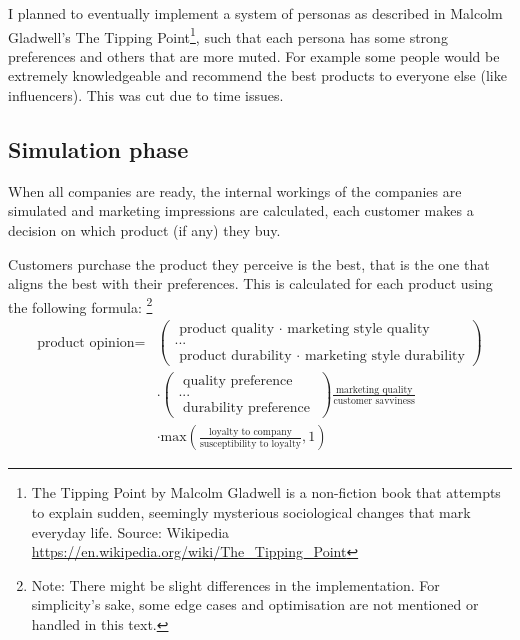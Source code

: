 I planned to eventually implement a system of personas as described in Malcolm Gladwell's The Tipping Point\footnote{The Tipping
	Point by Malcolm Gladwell is a non-fiction book that attempts to explain sudden, seemingly mysterious sociological changes that
	mark everyday life. Source: Wikipedia \href{https://en.wikipedia.org/wiki/The\_Tipping\_Point}{https://en.wikipedia.org/wiki/The\_Tipping\_Point}}, such that
each persona has some strong preferences and others that are more muted. For example some people would be extremely knowledgeable
and recommend the best products to everyone else (like influencers). This was cut due to time issues.

\subsection{Simulation phase}

When all companies are ready, the internal workings of the companies are simulated and marketing impressions are calculated,
each customer makes a decision on which product (if any) they buy.

Customers purchase the product they perceive is the best, that is the one that aligns the best with their preferences.
This is calculated for each product using the following formula: \footnote{Note: There might be slight differences in the
	implementation. For simplicity's sake, some edge cases and optimisation are not mentioned or handled in this text. }
\begin{align}
	\text{product opinion}  = & \begin{pmatrix}
		                            \text{ product quality } \cdot \text{ marketing style quality} \\
		                            ...                                                            \\
		                            \text{ product durability } \cdot \text{ marketing style durability}
	                            \end{pmatrix}                                 \\
	                          & \cdot \begin{pmatrix}
		                                  \text{ quality preference } \\
		                                  ...                         \\
		                                  \text{ durability preference }
	                                  \end{pmatrix} \frac{ \text{marketing quality}}{ \text{customer savviness}}                    \\
	                          & \cdot \text{max} \left(\frac{\text{loyalty to company}}{\text{susceptibility to loyalty}}, 1\right)
\end{align}

